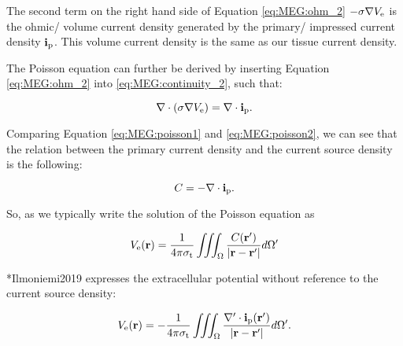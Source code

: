 {The second term on the right hand side of Equation \eqref{eq:MEG:ohm_2} $- \sigma {\bf \nabla} V_\mathrm{e}$ is the ohmic/ volume current density generated by the primary/ impressed current density ${\bf i}_\mathrm{p}$. This volume current density is the same as our tissue current density.

The Poisson equation can further be derived by inserting Equation \eqref{eq:MEG:ohm_2} into \eqref{eq:MEG:continuity_2}, such that:

\begin{equation}\label{eq:MEG:poisson2}
{\bf \nabla} \cdot (\sigma {\bf \nabla} V_\mathrm{e}) = {\bf \nabla} \cdot {\bf i}_\mathrm{p}.
\end{equation}


Comparing Equation \eqref{eq:MEG:poisson1} and \eqref{eq:MEG:poisson2}, we can see that the relation between the primary current density and the current source density is the following:

\begin{equation}
C = - {\bf \nabla} \cdot {\bf i}_\mathrm{p}.
\end{equation}

So, as we typically write the solution of the Poisson equation as

\begin{equation}
V_\mathrm{e}({\bf r}) = \frac{1}{4\pi \sigma_\mathrm{t}} \iiint_\Omega \frac{C({\bf r}')}{|{\bf r} - {\bf r}'|} d\Omega' 
\end{equation}

\citeasnoun**{Ilmoniemi2019} expresses the extracellular potential without reference to the current source density:

\begin{equation}
V_\mathrm{e}({\bf r}) = - \frac{1}{4\pi \sigma_\mathrm{t}} \iiint_\Omega \frac{{\bf \nabla}' \cdot {\bf i}_\mathrm{p}({\bf r}')}{|{\bf r} - {\bf r}'|} d\Omega'.
\end{equation}
}



